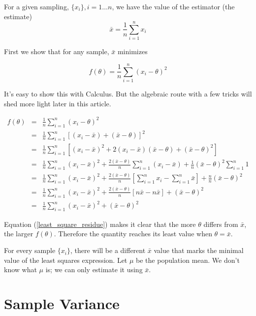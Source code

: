 \documentclass[]{article}
\begin{document}
For a given sampling, $\{x_i\}, i=1 \ldots n$, we have the
value of the estimator (the estimate)
$$
\bar{x} = \frac{1}{n} \sum_{i=1}^n x_i
$$

First we show that for any sample, $\bar{x}$ minimizes

\begin{equation} \label{least_squares}
f(\theta) = \frac{1}{n} \sum_{i=1}^n (x_i - \theta)^2
\end{equation}

It's easy to show this with Calculus.  But the algebraic
route with a few tricks will shed more light later in
this article.

\begin{eqnarray}
f(\theta) &= &\frac{1}{n} \sum_{i=1}^n (x_i - \theta)^2 \nonumber \\
  &= &\frac{1}{n} \sum_{i=1}^n \left[ (x_i - \bar{x}) + (\bar{x} - \theta)\right]^2 \nonumber \\
  &= &\frac{1}{n} \sum_{i=1}^n \left[ (x_i - \bar{x})^2 + 2 (x_i-\bar{x})(\bar{x} - \theta) + (\bar{x} - \theta)^2 \right] \nonumber \\
  &= &\frac{1}{n} \sum_{i=1}^n (x_i - \bar{x})^2 + 
     \frac{2(\bar{x} - \theta)}{n} \sum_{i=1}^n (x_i - \bar{x}) +
     \frac{1}{n} (\bar{x} - \theta)^2 \sum_{i=1}^n 1 \nonumber \\
  &= &\frac{1}{n} \sum_{i=1}^n (x_i - \bar{x})^2 + 
     \frac{2(\bar{x} - \theta)}{n} \left[ \sum_{i=1}^n x_i - \sum_{i=1}^n  \bar{x} \right]  +
     \frac{n}{n} (\bar{x} - \theta)^2 \nonumber \\
  &= &\frac{1}{n} \sum_{i=1}^n (x_i - \bar{x})^2 + 
     \frac{2(\bar{x} - \theta)}{n} \left[ n \bar{x} - n \bar{x} \right]  +
     (\bar{x} - \theta)^2 \nonumber \\
  &= &\frac{1}{n} \sum_{i=1}^n (x_i - \bar{x})^2 + 
     (\bar{x} - \theta)^2 \label{least_square_residue}
\end{eqnarray}

Equation (\ref{least_square_residue}) makes it clear that
the more $\theta$ differs from $\bar{x}$, the larger $f(\theta)$.
Therefore the quantity reaches its least value
when $\theta = \bar{x}$.

For every sample $\{x_i\}$, there will be a different $\bar{x}$
value that marks the minimal value of the least squares expression.
Let $\mu$ be the population mean.  We don't know what $\mu$ is; we
can only estimate it using $\bar{x}$.

\section{Sample Variance}
\end{document}
